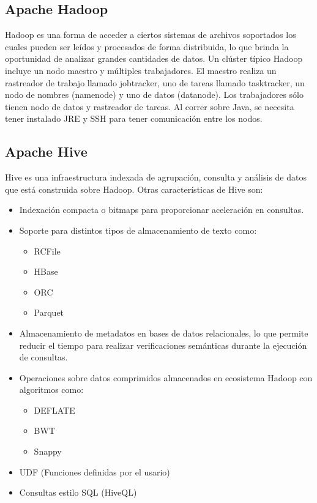 \subsection{Apache Hadoop}
Hadoop\cite{hadoop} es una forma de acceder a ciertos sistemas de archivos soportados los cuales  pueden ser leídos y procesados de forma distribuida, lo que brinda la oportunidad de analizar grandes cantidades de datos. Un clúster típico Hadoop incluye un nodo maestro y múltiples trabajadores. El maestro realiza un rastreador de trabajo llamado jobtracker, uno de tareas llamado tasktracker, un nodo de nombres (namenode) y uno de datos (datanode). Los trabajadores sólo tienen nodo de datos y rastreador de tareas. Al correr sobre Java, se necesita tener instalado JRE y SSH para tener comunicación entre los nodos.

\subsection{Apache Hive}
Hive es una infraestructura indexada de agrupación, consulta y análisis de datos que está construida sobre Hadoop. Otras características de Hive son:
\begin{itemize}
    \item Indexación compacta o bitmaps para proporcionar aceleración en consultas.
    \item Soporte para distintos tipos de almacenamiento de texto como:
        \begin{itemize}
            \item RCFile
            \item HBase
            \item ORC
            \item Parquet
        \end{itemize}
    \item Almacenamiento de metadatos en bases de datos relacionales, lo que permite reducir el tiempo para realizar verificaciones semánticas durante la ejecución de consultas.
    \item Operaciones sobre datos comprimidos almacenados en ecosistema Hadoop con algoritmos como:
        \begin{itemize}
            \item DEFLATE
            \item BWT
            \item Snappy
        \end{itemize}
    \item UDF (Funciones definidas por el usario)
    \item Consultas estilo SQL (HiveQL)
\end{itemize}
